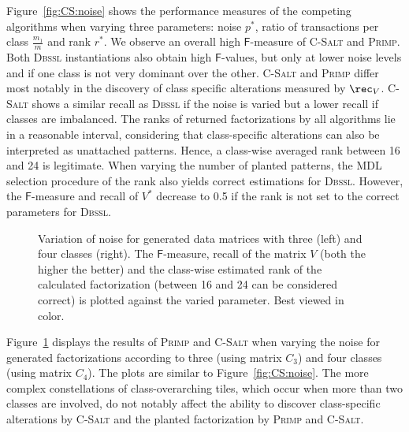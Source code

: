 Figure~\ref{fig:CS:noise} shows the performance measures of the competing algorithms when varying three parameters: noise $p^*$, ratio of transactions per class $\frac{m_1}{m}$ and rank $r^*$.
We observe an overall high $\mathsf{F}$-measure of \textsc{C-Salt} and \textsc{Primp}.
Both \textsc{Dbssl} instantiations also obtain high $\mathsf{F}$-values, but only at lower noise levels and if one class is not very dominant over the other.
\textsc{C-Salt} and \textsc{Primp} differ most notably in the discovery of class specific alterations measured by $\rec_V$. \textsc{C-Salt} shows a similar recall as \textsc{Dbssl} if the noise is varied but a lower recall if classes are imbalanced. The ranks of returned factorizations by all algorithms lie in a reasonable interval, considering that class-specific alterations can also be interpreted as unattached patterns. Hence, a class-wise averaged rank between 16 and 24 is legitimate. When varying the number of planted patterns, the MDL selection procedure of the rank also yields correct estimations for \textsc{Dbssl}. However, the $\mathsf{F}$-measure and recall of $V^*$ decrease to 0.5 if the rank is not set to the correct parameters for \textsc{Dbssl}.

\begin{figure}[!t]
\centering

\caption{Variation of noise for generated data matrices with three (left) and four classes (right). The $\mathsf{F}$-measure, recall of the matrix $V$ (both the higher the better) and the class-wise estimated rank of the calculated factorization (between 16 and 24 can be considered correct) is plotted against the varied parameter. Best viewed in color.}
\label{fig:synthClass}
\end{figure}
Figure~\ref{fig:synthClass} displays the results of \textsc{Primp} and \textsc{C-Salt} when varying the noise for generated factorizations according to three (using matrix $C_3$) and four classes (using matrix $C_4$). The plots are similar to Figure~\ref{fig:CS:noise}. The more complex constellations of class-overarching tiles, which occur when more than two classes are involved, do not notably affect the ability to discover class-specific alterations by \textsc{C-Salt} and the planted factorization by \textsc{Primp} and \textsc{C-Salt}.

